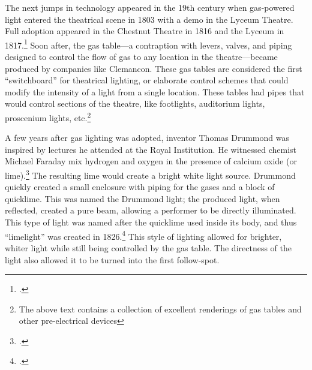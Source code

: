 \documentclass[
    12pt,
    twoside,
    bibstyle=chicago,
    headerstyle=uppercase,
	bibfile=biblatex_updating.bib
]{reedthesis}
\begin{document}

The next jumps in technology appeared in the 19th century when gas-powered light entered the theatrical scene in 1803 with a demo in the Lyceum Theatre. Full adoption appeared in the Chestnut Theatre in 1816 and the Lyceum in 1817.\footcite[p. 174]{pilbrowStageLightingDesign1997} Soon after, the gas table---a contraption with levers, valves, and piping designed to control the flow of gas to any location in the theatre---became produced by companies like Clemancon. These gas tables are considered the first “switchboard” for theatrical lighting, or elaborate control schemes that could modify the intensity of a light from a single location. These tables had pipes that would control sections of the theatre, like footlights, auditorium lights, proscenium lights, etc.\footnote{The above text contains a collection of excellent renderings of gas tables and other pre-electrical devices}

A few years after gas lighting was adopted, inventor Thomas Drummond was inspired by lectures he attended at the Royal Institution. He witnessed chemist Michael Faraday mix hydrogen and oxygen in the presence of calcium oxide (or lime).\footcite[p. 157]{craigm.carverHistoryEnglishIts1991} The resulting lime would create a bright white light source. Drummond quickly created a small enclosure with piping for the gases and a block of quicklime. This was named the Drummond light; the produced light, when reflected, created a pure beam, allowing a performer to be directly illuminated. This type of light was named after the quicklime used inside its body, and thus “limelight” was created in 1826.\footcite[p. 174]{pilbrowStageLightingDesign1997} This style of lighting allowed for brighter, whiter light while still being controlled by the gas table. The directness of the light also allowed it to be turned into the first follow-spot.
\end{document}
